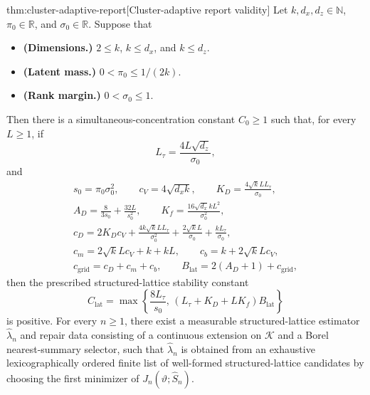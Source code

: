 \begin{theoremv}{thm:cluster-adaptive-report}[Cluster-adaptive report validity]
Let \(k,d_x,d_z\in\mathbb N\), \(\pi_0\in\mathbb R\), and \(\sigma_0\in\mathbb R\).  Suppose that
\begin{itemize}
\item \textbf{(Dimensions.)} \(2\le k\), \(k\le d_x\), and \(k\le d_z\).
\item \textbf{(Latent mass.)} \(0<\pi_0\le 1/(2k)\).
\item \textbf{(Rank margin.)} \(0<\sigma_0\le 1\).
\end{itemize}
Then there is a simultaneous-concentration constant \(C_0\ge 1\) such that, for every \(L\ge 1\), if
\[
L_\tau=\frac{4L\sqrt{d_z}}{\sigma_0},
\]
and
\[
\begin{gathered}
s_0=\pi_0\sigma_0^2,\qquad
c_V=4\sqrt{d_xk},\qquad
K_D=\frac{4\sqrt{k}LL_\tau}{\sigma_0},\\
A_D=\frac{8}{3s_0}+\frac{32L}{s_0^2},\qquad
K_f=\frac{16\sqrt{d_x}kL^2}{\sigma_0^2},\\
c_D=2K_Dc_V+\frac{4k\sqrt{k}LL_\tau}{\sigma_0^2}
      +\frac{2\sqrt{k}L}{\sigma_0}+\frac{kL_\tau}{\sigma_0},\\
c_m=2\sqrt{k}Lc_V+k+kL,\qquad
c_b=k+2\sqrt{k}Lc_V,\\
c_{\mathrm{grid}}=c_D+c_m+c_b,\qquad
B_{\mathrm{lat}}=2(A_D+1)+c_{\mathrm{grid}},
\end{gathered}
\]
then the prescribed structured-lattice stability constant
\[
C_{\mathrm{lat}}
=
\max\left\{
\frac{8L_\tau}{s_0},
\,
(L_\tau+K_D+LK_f)B_{\mathrm{lat}}
\right\}
\]
is positive.  For every \(n\ge 1\), there exist a measurable structured-lattice estimator
\(\widehat\lambda_n\) and repair data consisting of a continuous extension on \(\mathcal K\) and a Borel nearest-summary selector, such that \(\widehat\lambda_n\) is obtained from an exhaustive lexicographically ordered finite list of well-formed structured-lattice candidates by choosing the first minimizer of \(J_n(\vartheta;\widehat S_n)\).


\end{theoremv}

